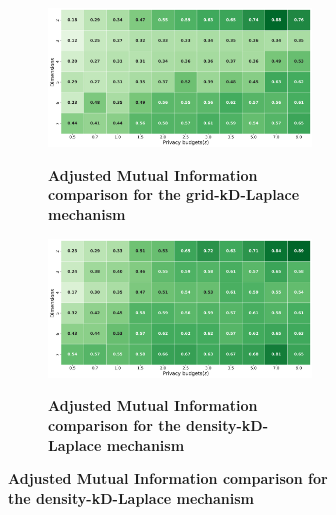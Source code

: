 \begin{figure}[H]
    \centering
    \begin{subfigure}[b]{0.90\textwidth}
        \begin{subfigure}[c]{1\textwidth}
            \caption{\textbf{Adjusted Mutual Information comparison for the grid-kD-Laplace mechanism}}
            \includegraphics[width=1\textwidth]{Results/kd-laplace/grid-kd-Laplace/seeds-dataset/ami.png}
            \label{fig:ami_seeds-dataset_comparison_grid-kd_2d}
        \end{subfigure}
        \vfill %
        \begin{subfigure}[c]{1\textwidth}
            \caption{\textbf{Adjusted Mutual Information comparison for the density-kD-Laplace mechanism}}
            \includegraphics[width=1\textwidth]{Results/kd-laplace/density-kd-Laplace/seeds-dataset/ami.png}
            \label{fig:ami_seeds-dataset_comparison_density-kd_2d}
        \end{subfigure}
    \end{subfigure}
    \hfill %
    \begin{subfigure}[b]{0.075\textwidth}

\end{subfigure}
\end{figure}
